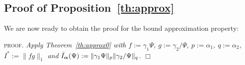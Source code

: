 \documentclass{article} %
\newcommand{\f}{f}
\newcommand{\g}{g}
\newcommand{\q}{q}
\def\p{p}
\newenvironment{proof}{\textsc{proof.}\it}{\hfill{$\Box$}}
\newtheorem{theorem}{Theorem}
\begin{document}
%
%
%
%
%


\subsection*{Proof of Proposition~\ref{th:approx}}
We are now ready to obtain the proof for the bound approximation property:

\begin{proof}
Apply Theorem~\ref{th:approx0} with $f:=\gamma_1\Psi$, $\g:=\gamma_2/\Psi$, $\p:=\alpha_1$, $\q:=\alpha_2$, $I^*:=\|\f\g\|_1$ and $\bar I_\balpha (\Psi):= \|\gamma_1\Psi\|_\p\|\gamma_2/\Psi\|_\q$.
\end{proof}







\end{document}
